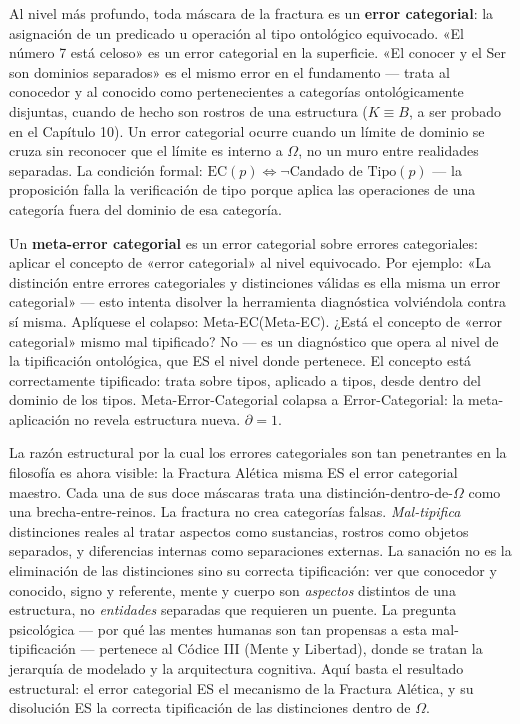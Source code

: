 \documentclass[10pt, openany, oneside]{book}
\begin{document}
Al nivel más profundo, toda máscara de la fractura es un \textbf{error categorial}: la asignación de un predicado u operación al tipo ontológico equivocado. «El número 7 está celoso» es un error categorial en la superficie. «El conocer y el Ser son dominios separados» es el mismo error en el fundamento --- trata al conocedor y al conocido como pertenecientes a categorías ontológicamente disjuntas, cuando de hecho son rostros de una estructura ($K \equiv B$, a ser probado en el Capítulo 10). Un error categorial ocurre cuando un límite de dominio se cruza sin reconocer que el límite es interno a $\Omega$, no un muro entre realidades separadas. La condición formal: $\text{EC}(p) \iff \neg\text{Candado de Tipo}(p)$ --- la proposición falla la verificación de tipo porque aplica las operaciones de una categoría fuera del dominio de esa categoría.

Un \textbf{meta-error categorial} es un error categorial sobre errores categoriales: aplicar el concepto de «error categorial» al nivel equivocado. Por ejemplo: «La distinción entre errores categoriales y distinciones válidas es ella misma un error categorial» --- esto intenta disolver la herramienta diagnóstica volviéndola contra sí misma. Aplíquese el colapso: Meta-EC(Meta-EC). ¿Está el concepto de «error categorial» mismo mal tipificado? No --- es un diagnóstico que opera al nivel de la tipificación ontológica, que ES el nivel donde pertenece. El concepto está correctamente tipificado: trata sobre tipos, aplicado a tipos, desde dentro del dominio de los tipos. Meta-Error-Categorial colapsa a Error-Categorial: la meta-aplicación no revela estructura nueva. $\partial = 1$.

La razón estructural por la cual los errores categoriales son tan penetrantes en la filosofía es ahora visible: la Fractura Alética misma ES el error categorial maestro. Cada una de sus doce máscaras trata una distinción-dentro-de-$\Omega$ como una brecha-entre-reinos. La fractura no crea categorías falsas. \textit{Mal-tipifica} distinciones reales al tratar aspectos como sustancias, rostros como objetos separados, y diferencias internas como separaciones externas. La sanación no es la eliminación de las distinciones sino su correcta tipificación: ver que conocedor y conocido, signo y referente, mente y cuerpo son \textit{aspectos} distintos de una estructura, no \textit{entidades} separadas que requieren un puente. La pregunta psicológica --- por qué las mentes humanas son tan propensas a esta mal-tipificación --- pertenece al Códice III (Mente y Libertad), donde se tratan la jerarquía de modelado y la arquitectura cognitiva. Aquí basta el resultado estructural: el error categorial ES el mecanismo de la Fractura Alética, y su disolución ES la correcta tipificación de las distinciones dentro de $\Omega$.
\end{document}
